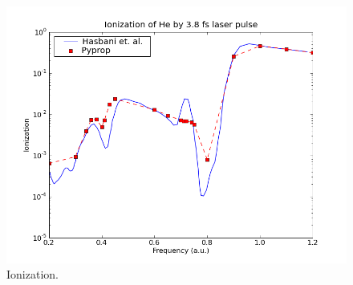 \documentclass[a4paper,12pt]{paper}
\begin{document}
\begin{figure}[ht]
\begin{center}
	\includegraphics[width=\textwidth]{hasbani_pyprop2e_ionization.png}
\end{center}
\caption{Ionization.}
\end{figure}
\end{document}
